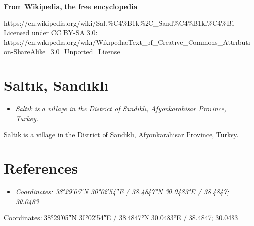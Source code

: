 \textbf{From Wikipedia, the free encyclopedia}

https://en.wikipedia.org/wiki/Salt\%C4\%B1k\%2C\_Sand\%C4\%B1kl\%C4\%B1\\
Licensed under CC BY-SA 3.0:\\
https://en.wikipedia.org/wiki/Wikipedia:Text\_of\_Creative\_Commons\_Attribution-ShareAlike\_3.0\_Unported\_License

\section{Saltık, Sandıklı}\label{saltux131k-sandux131klux131}

\begin{itemize}
\item
  \emph{Saltık is a village in the District of Sandıklı, Afyonkarahisar
  Province, Turkey.}
\end{itemize}

Saltık is a village in the District of Sandıklı, Afyonkarahisar
Province, Turkey.

\section{References}\label{references}

\begin{itemize}
\item
  \emph{Coordinates: 38°29′05″N 30°02′54″E﻿ / ﻿38.4847°N 30.0483°E﻿ /
  38.4847; 30.0483}
\end{itemize}

Coordinates: 38°29′05″N 30°02′54″E﻿ / ﻿38.4847°N 30.0483°E﻿ / 38.4847;
30.0483
